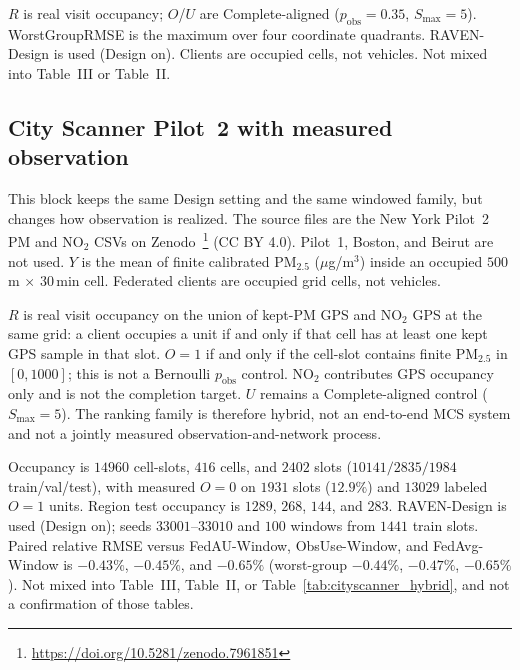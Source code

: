 \begin{table}[t]
\begin{minipage}{\columnwidth}
\raggedright\scriptsize
$R$ is real visit occupancy; $O$/$U$ are Complete-aligned
($p_{\mathrm{obs}}=0.35$, $S_{\max}=5$).
WorstGroupRMSE is the maximum over four coordinate quadrants.
RAVEN-Design is used (Design on).
Clients are occupied cells, not vehicles.
Not mixed into Table~III or
Table~II.
\end{minipage}
\end{table}

\subsection{City Scanner Pilot~2 with measured observation}
\label{app:cityscanner_p2_measured_o}

This block keeps the same Design setting and the same windowed family, but
changes how observation is realized.
The source files are the New York Pilot~2 {PM} and {NO}$_2$ CSVs on
Zenodo~\footnote{\url{https://doi.org/10.5281/zenodo.7961851}}
({CC BY} 4.0).  Pilot~1, Boston, and Beirut are not used.
$Y$ is the mean of finite calibrated {PM}$_{2.5}$ ($\mu$g/m$^3$) inside
an occupied $500$\,m $\times$ $30$\,min cell.
Federated clients are occupied grid cells, not vehicles.

$R$ is real visit occupancy on the union of kept-{PM} GPS and {NO}$_2$ GPS
at the same grid: a client occupies a unit if and only if that cell has at
least one kept GPS sample in that slot.
$O=1$ if and only if the cell-slot contains finite {PM}$_{2.5}$ in
$[0,1000]$; this is not a Bernoulli $p_{\mathrm{obs}}$ control.
{NO}$_2$ contributes GPS occupancy only and is not the completion target.
$U$ remains a Complete-aligned control ($S_{\max}=5$).
The ranking family is therefore hybrid, not an end-to-end MCS system and
not a jointly measured observation-and-network process.

Occupancy is $14960$ cell-slots, $416$ cells, and $2402$ slots
($10141/2835/1984$ train/val/test), with measured $O=0$ on $1931$ slots
($12.9\%$) and $13029$ labeled $O=1$ units.
Region test occupancy is $1289$, $268$, $144$, and $283$.
RAVEN-Design is used (Design on); seeds $33001$--$33010$ and
$100$ windows from $1441$ train slots.
Paired relative RMSE versus FedAU-Window, ObsUse-Window, and FedAvg-Window is
$-0.43\%$, $-0.45\%$, and $-0.65\%$ (worst-group $-0.44\%$, $-0.47\%$,
$-0.65\%$).
Not mixed into Table~III,
Table~II, or Table~\ref{tab:cityscanner_hybrid},
and not a confirmation of those tables.

